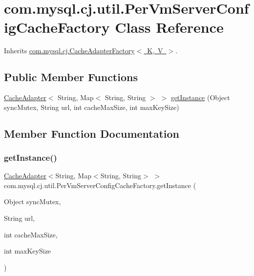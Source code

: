 \hypertarget{classcom_1_1mysql_1_1cj_1_1util_1_1_per_vm_server_config_cache_factory}{}\section{com.\+mysql.\+cj.\+util.\+Per\+Vm\+Server\+Config\+Cache\+Factory Class Reference}
\label{classcom_1_1mysql_1_1cj_1_1util_1_1_per_vm_server_config_cache_factory}


Inherits \mbox{\hyperlink{interfacecom_1_1mysql_1_1cj_1_1_cache_adapter_factory}{com.\+mysql.\+cj.\+Cache\+Adapter\+Factory$<$ K, V $>$}}.

\subsection*{Public Member Functions}
\begin{DoxyCompactItemize}
\item 
\mbox{\hyperlink{interfacecom_1_1mysql_1_1cj_1_1_cache_adapter}{Cache\+Adapter}}$<$ String, Map$<$ String, String $>$ $>$ \mbox{\hyperlink{classcom_1_1mysql_1_1cj_1_1util_1_1_per_vm_server_config_cache_factory_a3d72d677ff8a942061bf2d6f8695c88d}{get\+Instance}} (Object sync\+Mutex, String url, int cache\+Max\+Size, int max\+Key\+Size)
\end{DoxyCompactItemize}


\subsection{Member Function Documentation}
\mbox{\label{classcom_1_1mysql_1_1cj_1_1util_1_1_per_vm_server_config_cache_factory_a3d72d677ff8a942061bf2d6f8695c88d}} 
\subsubsection{\texorpdfstring{get\+Instance()}{getInstance()}}
{\footnotesize\ttfamily \mbox{\hyperlink{interfacecom_1_1mysql_1_1cj_1_1_cache_adapter}{Cache\+Adapter}}$<$String, Map$<$String, String$>$ $>$ com.\+mysql.\+cj.\+util.\+Per\+Vm\+Server\+Config\+Cache\+Factory.\+get\+Instance (\begin{DoxyParamCaption}\item[{Object}]{sync\+Mutex,  }\item[{String}]{url,  }\item[{int}]{cache\+Max\+Size,  }\item[{int}]{max\+Key\+Size }\end{DoxyParamCaption})}



